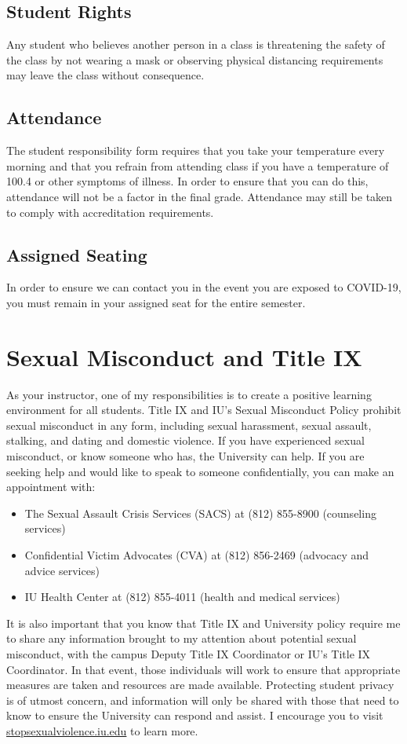 \documentclass[12pt]{article} %
\begin{document}
\subsection{Student Rights}
Any student who believes another person in a class is threatening the safety of the class by not wearing a mask or observing physical distancing requirements may leave the class without consequence.  
\subsection{Attendance}
The student responsibility form requires that you take your temperature every morning and that you refrain
from attending class if you have a temperature of 100.4 or other symptoms of illness. In order to ensure
that you can do this, attendance will not be a factor in the final grade. Attendance may still be taken to
comply with accreditation requirements.
\subsection{Assigned Seating}
In order to ensure we can contact you in the event you are exposed to COVID-19, you must remain in your
assigned seat for the entire semester.
\section{Sexual Misconduct and Title IX}
As your instructor, one of my responsibilities is to create a positive learning environment for all students. Title IX and IU’s Sexual Misconduct Policy prohibit sexual misconduct in any form, including sexual harassment, sexual assault, stalking, and dating and domestic violence. If you have experienced sexual misconduct, or know someone who has, the University can help. If you are seeking help and would like to speak to someone confidentially, you can make an appointment with:
\begin{itemize}
	\item The Sexual Assault Crisis Services (SACS) at (812) 855-8900 (counseling services)
	\item Confidential Victim Advocates (CVA) at (812) 856-2469 (advocacy and advice services)
	\item IU Health Center at (812) 855-4011 (health and medical services)
\end{itemize}
It is also important that you know that Title IX and University policy require me to share any information brought to my attention about potential sexual misconduct, with the campus Deputy Title IX Coordinator or IU’s Title IX Coordinator. In that event, those individuals will work to ensure that appropriate measures are taken and resources are made available. Protecting student privacy is of utmost concern, and information will only be shared with those that need to know to ensure the University can respond and assist.  I encourage you to visit \url{stopsexualviolence.iu.edu} to learn more.
\end{document}
